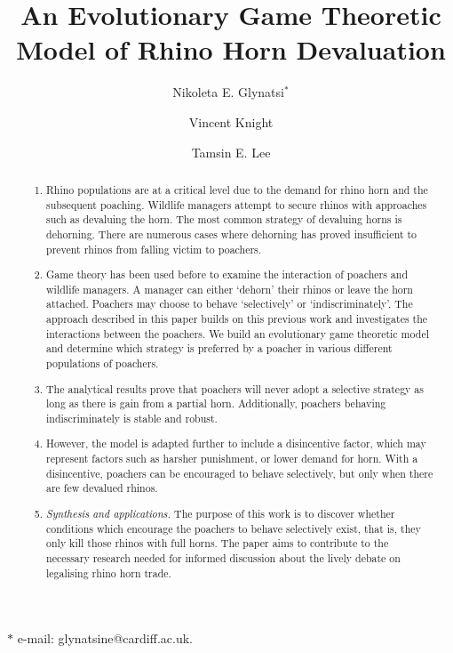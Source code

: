 \documentclass[10pt]{article}
\title{An Evolutionary Game Theoretic Model of Rhino Horn Devaluation}
\author[1]{Nikoleta E. Glynatsi$^{\ast}$}
\author[1]{Vincent Knight}
\author[2]{Tamsin E. Lee}
\affil[1]{School of Mathematics, Cardiff University, CF24 4AG}
\affil[2]{Mathematical Institute, University of Oxford, OX2 6GG}
\date{}
\begin{document}
\maketitle

\noindent{} $\ast$ e-mail: glynatsine@cardiff.ac.uk.

\begin{abstract}
\noindent{}

\begin{enumerate}
    \item Rhino populations are at a critical level due to the demand for rhino horn and
    the subsequent poaching. Wildlife managers attempt to secure rhinos with
    approaches such as devaluing the horn. The most common strategy of devaluing
    horns is dehorning. There are numerous cases where dehorning has proved insufficient
    to prevent rhinos from falling victim to poachers.
    \item Game theory has been used before to examine the interaction
    of poachers and wildlife managers. A manager can either `dehorn' their rhinos or
    leave the horn attached. Poachers may choose to behave `selectively' or
    `indiscriminately'. The approach described in this paper builds on this previous
    work and investigates the interactions between the poachers. We build an evolutionary
    game theoretic model and determine which strategy is preferred by a poacher in various
    different populations of poachers.
    \item The analytical results prove that poachers will never adopt a selective
    strategy as long as there is gain from a partial horn. Additionally, poachers
    behaving indiscriminately is stable and robust.
    \item However, the model is adapted further to include a
    disincentive factor, which may represent factors such as harsher punishment, or
    lower demand for horn. With a disincentive, poachers can be encouraged to behave
    selectively, but only when there are few devalued rhinos.
    \item \textit{Synthesis and applications.} The purpose of this work is to discover whether
    conditions which encourage the poachers to behave selectively exist, that is,
    they only kill those rhinos with full horns. The paper aims to
    contribute to the necessary research needed for informed discussion about the
    lively debate on legalising rhino horn trade.

\end{enumerate}

\end{abstract}
\end{document}
